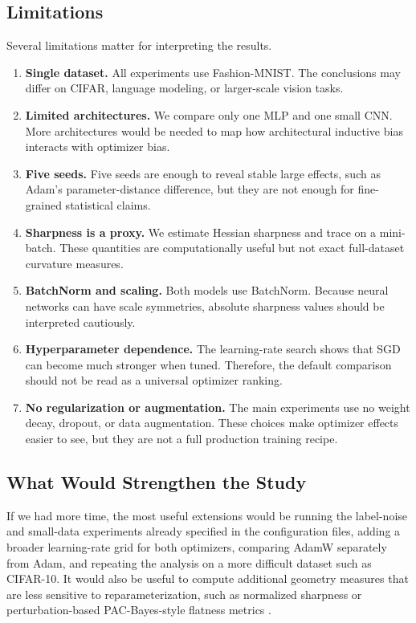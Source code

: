 \documentclass[11pt]{article}
\begin{document}
\subsection{Limitations}
\label{sec:limitations}

Several limitations matter for interpreting the results.

\begin{enumerate}
    \item \textbf{Single dataset.} All experiments use Fashion-MNIST. The conclusions may differ on CIFAR, language modeling, or larger-scale vision tasks.
    \item \textbf{Limited architectures.} We compare only one MLP and one small CNN. More architectures would be needed to map how architectural inductive bias interacts with optimizer bias.
    \item \textbf{Five seeds.} Five seeds are enough to reveal stable large effects, such as Adam's parameter-distance difference, but they are not enough for fine-grained statistical claims.
    \item \textbf{Sharpness is a proxy.} We estimate Hessian sharpness and trace on a mini-batch. These quantities are computationally useful but not exact full-dataset curvature measures.
    \item \textbf{BatchNorm and scaling.} Both models use BatchNorm. Because neural networks can have scale symmetries, absolute sharpness values should be interpreted cautiously.
    \item \textbf{Hyperparameter dependence.} The learning-rate search shows that SGD can become much stronger when tuned. Therefore, the default comparison should not be read as a universal optimizer ranking.
    \item \textbf{No regularization or augmentation.} The main experiments use no weight decay, dropout, or data augmentation. These choices make optimizer effects easier to see, but they are not a full production training recipe.
\end{enumerate}

\subsection{What Would Strengthen the Study}

If we had more time, the most useful extensions would be running the label-noise and small-data experiments already specified in the configuration files, adding a broader learning-rate grid for both optimizers, comparing AdamW separately from Adam, and repeating the analysis on a more difficult dataset such as CIFAR-10. It would also be useful to compute additional geometry measures that are less sensitive to reparameterization, such as normalized sharpness or perturbation-based PAC-Bayes-style flatness metrics \cite{neyshabur2017exploring}.
\end{document}
